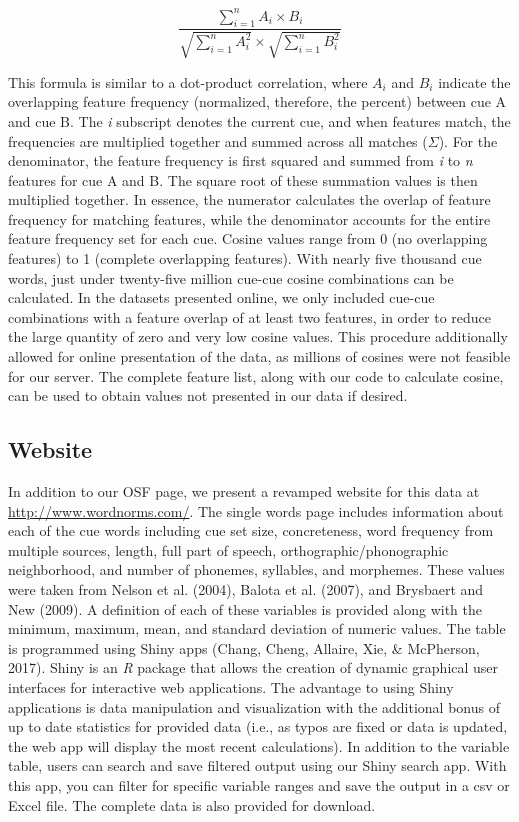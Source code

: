 \documentclass[english,,man]{apa6}
\theoremstyle{definition}
\theoremstyle{definition}
\theoremstyle{definition}
\theoremstyle{remark}
\begin{document}
\[
\frac{\sum_{i=1}^{n} A_i \times B_i} {\sqrt{\sum_{i=1}^{n} A_i^2} \times \sqrt{\sum_{i=1}^{n} B_i^2}}
\]

This formula is similar to a dot-product correlation, where \(A_i\) and
\(B_i\) indicate the overlapping feature frequency (normalized,
therefore, the percent) between cue A and cue B. The \emph{i} subscript
denotes the current cue, and when features match, the frequencies are
multiplied together and summed across all matches (\(\Sigma\)). For the
denominator, the feature frequency is first squared and summed from
\emph{i} to \emph{n} features for cue A and B. The square root of these
summation values is then multiplied together. In essence, the numerator
calculates the overlap of feature frequency for matching features, while
the denominator accounts for the entire feature frequency set for each
cue. Cosine values range from 0 (no overlapping features) to 1 (complete
overlapping features). With nearly five thousand cue words, just under
twenty-five million cue-cue cosine combinations can be calculated. In
the datasets presented online, we only included cue-cue combinations
with a feature overlap of at least two features, in order to reduce the
large quantity of zero and very low cosine values. This procedure
additionally allowed for online presentation of the data, as millions of
cosines were not feasible for our server. The complete feature list,
along with our code to calculate cosine, can be used to obtain values
not presented in our data if desired.

\hypertarget{website}{%
\subsection{Website}\label{website}}

In addition to our OSF page, we present a revamped website for this data
at \url{http://www.wordnorms.com/}. The single words page includes
information about each of the cue words including cue set size,
concreteness, word frequency from multiple sources, length, full part of
speech, orthographic/phonographic neighborhood, and number of phonemes,
syllables, and morphemes. These values were taken from Nelson et al.
(2004), Balota et al. (2007), and Brysbaert and New (2009). A definition
of each of these variables is provided along with the minimum, maximum,
mean, and standard deviation of numeric values. The table is programmed
using Shiny apps (Chang, Cheng, Allaire, Xie, \& McPherson, 2017). Shiny
is an \emph{R} package that allows the creation of dynamic graphical
user interfaces for interactive web applications. The advantage to using
Shiny applications is data manipulation and visualization with the
additional bonus of up to date statistics for provided data (i.e., as
typos are fixed or data is updated, the web app will display the most
recent calculations). In addition to the variable table, users can
search and save filtered output using our Shiny search app. With this
app, you can filter for specific variable ranges and save the output in
a csv or Excel file. The complete data is also provided for download.
\end{document}
